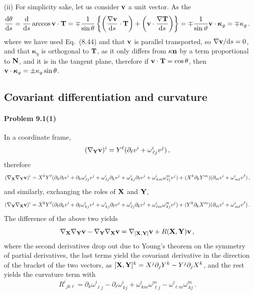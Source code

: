 \documentclass[a4paper,12pt]{article}
\def\d{\mathrm{d}}
\newcommand{\problem}[1]{\paragraph{Problem #1}}
\begin{document}
(ii) For simplicity sake, let us consider ${\bf v}$ a unit vector. As the 
\[
 \frac{\d\theta}{\d s} = \frac{\d}{\d s}\arccos {\bf v}\cdot {\bf T} = \mp\frac{1}{\sin\theta}\left\{ \left(\frac{\nabla \bf v}{\d s}\cdot {\bf T}\right)+ \left({\bf v}\cdot \frac{\nabla\bf T}{\d s}\right) \right\} = \mp\frac{1}{\sin\vartheta} {\bf v}\cdot \boldsymbol{\kappa}_g = \mp \kappa_g\,.
\]
where we have used Eq.\ (8.44) and that ${\bf v}$ is parallel transported, so $\nabla{\bf v}/\d s=0$, and that $\boldsymbol{\kappa}_g$ is orthogonal to ${\bf T}$, as it only differs from $\kappa {\bf n}$ by a term proportional to ${\bf N}$, and it is in the tangent plane, therefore if ${\bf v}\cdot{\bf T} = \cos\theta$, then ${\bf v}\cdot \boldsymbol{\kappa}_g = \pm\kappa_g\sin\theta$.


\subsection{Covariant differentiation and curvature}

\problem{9.1(1)} In a coordinate frame,
\[
 (\nabla_{\bf Y}{\bf v})^i = Y^\ell(\partial_\ell v^i + \omega^i_{\,\ell j}v^j)\,,
\]
therefore
\[
 (\nabla_{\bf X}\nabla_{\bf Y}{\bf v})^i = X^k Y^\ell(\partial_k\partial_\ell v^i + \partial_k\omega^i_{\,\ell j}v^j + \omega^i_{\,\ell j}\partial_k v^j + \omega^i_{\,kj}\partial_\ell v^j + \omega^i_{\,km}\omega^m_{\,\ell j}v^j)
 + (X^k\partial_k Y^m)(\partial_m v^i + \omega^i_{\,m\ell}v^\ell)\,,
\]
and similarly, exchanging the roles of ${\bf X}$ and ${\bf Y}$,
\[
 (\nabla_{\bf Y}\nabla_{\bf X}{\bf v})^i = X^k Y^\ell(\partial_\ell\partial_k v^i + \partial_\ell\omega^i_{\,k j}v^j + \omega^i_{\,k j}\partial_\ell v^j + \omega^i_{\,\ell j}\partial_k v^j + \omega^i_{\,\ell m}\omega^m_{\,k j}v^j)
 + (Y^k\partial_k X^m)(\partial_m v^i + \omega^i_{\,m\ell}v^\ell)\,.
\]
The difference of the above two yields
\[
 \nabla_{\bf X}\nabla_{\bf Y}{\bf v} - \nabla_{\bf Y}\nabla_{\bf X}{\bf v} = \nabla_{[{\bf X}, {\bf Y}]}{\bf v} + R({\bf X}, {\bf Y}){\bf v}\,,
\]
where the second derivatives drop out due to Young's theorem on the symmetry of partial derivatives, the last terms yield the covariant derivative in the direction of the bracket of the two vectors,
as $[{\bf X}, {\bf Y}]^k = X^j\partial_j Y^k - Y^j\partial_j X^k$, and the rest yields the curvature term with
\[
 R^{i}{}_{j k \ell} = \partial_k \omega^{i}_{\,\ell j} - \partial_\ell \omega^i_{\,kj} + \omega^i_{\,km}\omega^m_{\,\ell j} - \omega^i_{\,\ell m}\omega^m_{\,k j}\,.
\]
\end{document}
